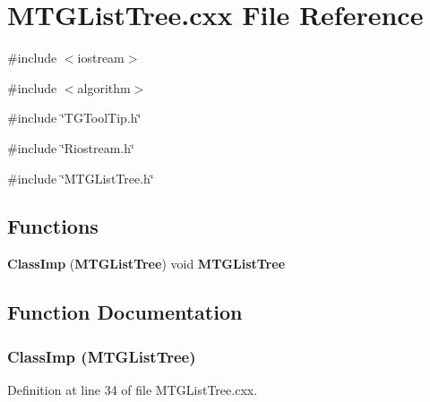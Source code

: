 \section{MTGListTree.cxx File Reference}
\label{MTGListTree_8cxx}
{\ttfamily \#include $<$iostream$>$}\par
{\ttfamily \#include $<$algorithm$>$}\par
{\ttfamily \#include \char`\"{}TGToolTip.h\char`\"{}}\par
{\ttfamily \#include \char`\"{}Riostream.h\char`\"{}}\par
{\ttfamily \#include \char`\"{}MTGListTree.h\char`\"{}}\par
\subsection*{Functions}
\begin{DoxyCompactItemize}
\item 
{\bf ClassImp} ({\bf MTGListTree}) void {\bf MTGListTree}
\end{DoxyCompactItemize}


\subsection{Function Documentation}
\subsubsection[{ClassImp}]{\setlength{\rightskip}{0pt plus 5cm}ClassImp ({\bf MTGListTree})}\label{MTGListTree_8cxx_a8b5b9bd5c977cb9d68cc18f9cbc82327}


Definition at line 34 of file MTGListTree.cxx.